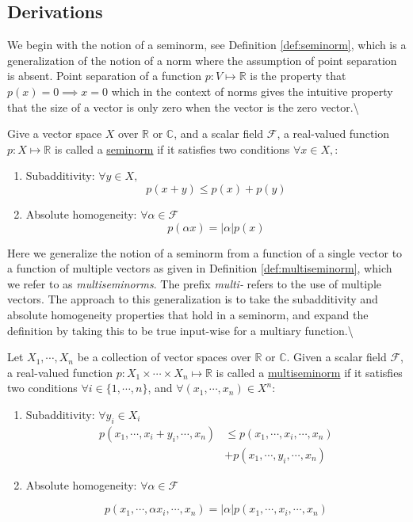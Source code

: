 \documentclass[
  letterpaper,
  DIV=11,
  numbers=noendperiod]{scrreprt}
\begin{document}
\subsection{Derivations}\label{derivations-1}

We begin with the notion of a seminorm, see Definition
\ref{def:seminorm}, which is a generalization of the notion of a norm
where the assumption of point separation is absent. Point separation of
a function \(p:V \mapsto \mathbb{R}\) is the property that
\(p(x) = 0 \implies x = 0\) which in the context of norms gives the
intuitive property that the size of a vector is only zero when the
vector is the zero vector.\textbackslash{}

\begin{Definition}[mydefinition=Seminorm \cite{weisstein}, label=def:seminorm]
Give a vector space $X$  over  $\mathbb{R}$ or $ \mathbb{C}$, and a scalar field $\mathcal{F}$, a real-valued function $p:X\mapsto \mathbb{R}$ is called a \underline{seminorm} if it satisfies two conditions $ \forall x \in X,$:
\begin{enumerate}
    \item Subadditivity: $ \forall y \in X,$
    $$p(x+y) \leq p(x) + p(y)$$
    \item Absolute homogeneity: $\forall \alpha \in \mathcal{F}$
    $$p(\alpha x) = |\alpha|p(x)$$
\end{enumerate}
\end{Definition}

Here we generalize the notion of a seminorm from a function of a single
vector to a function of multiple vectors as given in Definition
\ref{def:multiseminorm}, which we refer to as \textit{multiseminorms}.
The prefix \textit{multi-} refers to the use of multiple vectors. The
approach to this generalization is to take the subadditivity and
absolute homogeneity properties that hold in a seminorm, and expand the
definition by taking this to be true input-wise for a multiary
function.\textbackslash{}

\begin{Definition}[mydefinition=Multiseminorm, label=def:multiseminorm]
Let $X_1, \cdots, X_n$ be a collection of vector spaces over  $\mathbb{R}$ or $ \mathbb{C}$. Given a scalar field $\mathcal{F}$, a real-valued function $p: X_1 \times \cdots \times X_n \mapsto \mathbb{R}$ is called a \underline{multiseminorm}  if it satisfies two conditions  $\forall i \in \{1, \cdots,  n\}$, and $\forall (x_1, \cdots, x_n) \in X^n$:
\begin{enumerate}
    \item Subadditivity: $\forall y_i \in X_i$\begin{align*}
    p(x_1, \cdots, x_i + y_i, \cdots, x_n) & \leq p(x_1, \cdots, x_i, \cdots, x_n)\\
    & +p( x_1, \cdots, y_i, \cdots, x_n)
\end{align*}
    \item Absolute homogeneity: $\forall \alpha \in \mathcal{F}$

    $$p(x_1, \cdots, \alpha x_i, \cdots, x_n) = |\alpha| p(x_1, \cdots, x_i, \cdots, x_n)$$
\end{enumerate}
\end{Definition}
\end{document}
